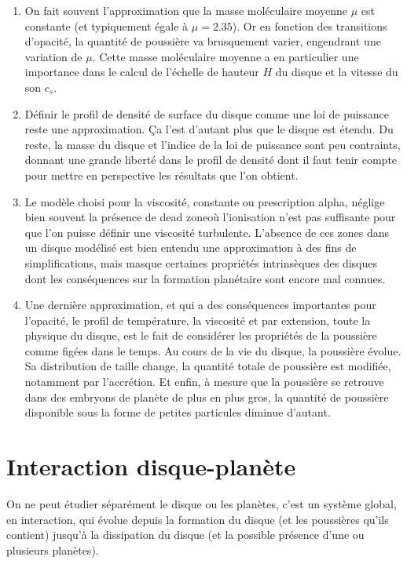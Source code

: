 \begin{enumerate}
\item On fait souvent l'approximation que la masse moléculaire moyenne $\mu$ est constante (et typiquement égale à $\mu=2.35$). Or en fonction des transitions d'opacité, la quantité de poussière va brusquement varier, engendrant une variation de $\mu$. Cette masse moléculaire moyenne a en particulier une importance dans le calcul de l'échelle de hauteur $H$ du disque et la vitesse du son $c_s$. 
\item Définir le profil de densité de surface du disque comme une loi de puissance reste une approximation. Ça l'est d'autant plus que le disque est étendu. Du reste, la masse du disque et l'indice de la loi de puissance sont peu contraints, donnant une grande liberté dans le profil de densité dont il faut tenir compte pour mettre en perspective les résultats que l'on obtient.
\item Le modèle choisi pour la viscosité, constante ou prescription alpha, néglige bien souvent la présence de \og dead zone\fg où l'ionisation n'est pas suffisante pour que l'on puisse définir une viscosité turbulente. L'absence de ces zones dans un disque modélisé est bien entendu une approximation à des fins de simplifications, mais masque certaines propriétés intrinsèques des disques dont les conséquences sur la formation planétaire sont encore mal connues.
\item Une dernière approximation, et qui a des conséquences importantes pour l'opacité, le profil de température, la viscosité et par extension, toute la physique du disque, est le fait de considérer les propriétés de la poussière comme figées dans le temps. Au cours de la vie du disque, la poussière évolue. Sa distribution de taille change, la quantité totale de poussière est modifiée, notamment par l'accrétion. Et enfin, à mesure que la poussière se retrouve dans des embryons de planète de plus en plus gros, la quantité de poussière disponible sous la forme de petites particules diminue d'autant. 
\end{enumerate}

\section{Interaction disque-planète}
On ne peut étudier séparément le disque ou les planètes, c'est un système global, en interaction, qui évolue depuis la formation du disque (et les poussières qu'ils contient) jusqu'à la dissipation du disque (et la possible présence d'une ou plusieurs planètes).

